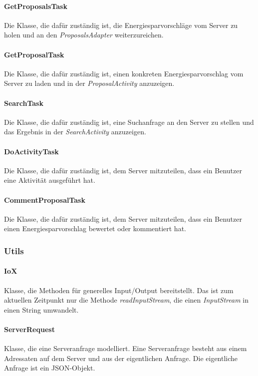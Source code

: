 \paragraph{GetProposalsTask} Die Klasse, die dafür zuständig ist, die Energiesparvorschläge vom Server zu holen und an den \emph{ProposalsAdapter} weiterzureichen.
\paragraph{GetProposalTask} Die Klasse, die dafür zuständig ist, einen konkreten Energiesparvorschlag vom Server zu laden und in der \emph{ProposalActivity} anzuzeigen.
\paragraph{SearchTask} Die Klasse, die dafür zuständig ist, eine Suchanfrage an den Server zu stellen und das Ergebnis in der \emph{SearchActivity} anzuzeigen.
\paragraph{DoActivityTask} Die Klasse, die dafür zuständig ist, dem Server mitzuteilen, dass ein Benutzer eine Aktivität ausgeführt hat.
\paragraph{CommentProposalTask} Die Klasse, die dafür zuständig ist, dem Server mitzuteilen, dass ein Benutzer einen Energiesparvorschlag bewertet oder kommentiert hat.

\subsubsection{Utils}
\paragraph{IoX} Klasse, die Methoden für generelles Input/Output bereitstellt. Das ist zum aktuellen Zeitpunkt nur die Methode \emph{readInputStream}, die einen \emph{InputStream} in einen String umwandelt.
\paragraph{ServerRequest} Klasse, die eine Serveranfrage modelliert. Eine Serveranfrage besteht aus einem Adressaten auf dem Server und aus der eigentlichen Anfrage. Die eigentliche Anfrage ist ein JSON-Objekt.
